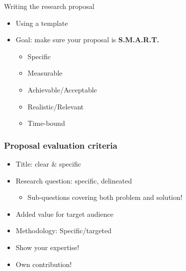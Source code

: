 \documentclass[aspectratio=169]{beamer}
\begin{document}
    \begin{frame}{Writing the research proposal}
        
        \begin{itemize}
            \item Using a template
            \item Goal: make sure your proposal is \textbf{S.M.A.R.T.}
            \begin{itemize}
                \item Specific
                \item Measurable
                \item Achievable/Acceptable
                \item Realistic/Relevant
                \item Time-bound
            \end{itemize}
        \end{itemize}
    \end{frame}
    
    \begin{frame}
        \frametitle{Proposal evaluation criteria}
        
        \begin{itemize}
            \item Title: clear \& specific
            \item Research question: specific, delineated
            \begin{itemize}
                \item  Sub-questions covering both problem and solution!
            \end{itemize} 
            \item Added value for target audience
            \item Methodology: Specific/targeted
            \item Show your expertise!
            \item Own contribution!
        \end{itemize}
        
    \end{frame}
        
\end{document}
